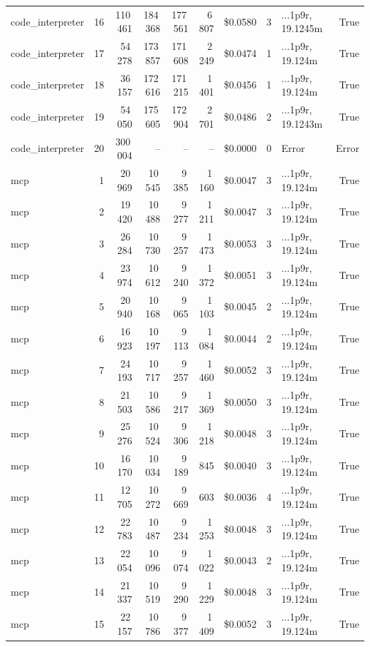 \documentclass[a4paper,11pt]{article}
\begin{document}
\begin{table}[H]
{\begin{tabular}{l r r r r r r r l r}
code\_interpreter & 16 & 110\,461 & 184\,368 & 177\,561 & 6\,807 & \$0.0580 & 3 & ...1p9r, 19.1245m & True \\
code\_interpreter & 17 & 54\,278 & 173\,857 & 171\,608 & 2\,249 & \$0.0474 & 1 & ...1p9r, 19.124m & True \\
code\_interpreter & 18 & 36\,157 & 172\,616 & 171\,215 & 1\,401 & \$0.0456 & 1 & ...1p9r, 19.124m & True \\
code\_interpreter & 19 & 54\,050 & 175\,605 & 172\,904 & 2\,701 & \$0.0486 & 2 & ...1p9r, 19.1243m & True \\
code\_interpreter & 20 & 300\,004 & -- & -- & -- & \$0.0000 & 0 & Error & Error \\
\midrule
mcp & 1 & 20\,969 & 10\,545 & 9\,385 & 1\,160 & \$0.0047 & 3 & ...1p9r, 19.124m & True \\
mcp & 2 & 19\,420 & 10\,488 & 9\,277 & 1\,211 & \$0.0047 & 3 & ...1p9r, 19.124m & True \\
mcp & 3 & 26\,284 & 10\,730 & 9\,257 & 1\,473 & \$0.0053 & 3 & ...1p9r, 19.124m & True \\
mcp & 4 & 23\,974 & 10\,612 & 9\,240 & 1\,372 & \$0.0051 & 3 & ...1p9r, 19.124m & True \\
mcp & 5 & 20\,940 & 10\,168 & 9\,065 & 1\,103 & \$0.0045 & 2 & ...1p9r, 19.124m & True \\
mcp & 6 & 16\,923 & 10\,197 & 9\,113 & 1\,084 & \$0.0044 & 2 & ...1p9r, 19.124m & True \\
mcp & 7 & 24\,193 & 10\,717 & 9\,257 & 1\,460 & \$0.0052 & 3 & ...1p9r, 19.124m & True \\
mcp & 8 & 21\,503 & 10\,586 & 9\,217 & 1\,369 & \$0.0050 & 3 & ...1p9r, 19.124m & True \\
mcp & 9 & 25\,276 & 10\,524 & 9\,306 & 1\,218 & \$0.0048 & 3 & ...1p9r, 19.124m & True \\
mcp & 10 & 16\,170 & 10\,034 & 9\,189 & 845 & \$0.0040 & 3 & ...1p9r, 19.124m & True \\
mcp & 11 & 12\,705 & 10\,272 & 9\,669 & 603 & \$0.0036 & 4 & ...1p9r, 19.124m & True \\
mcp & 12 & 22\,783 & 10\,487 & 9\,234 & 1\,253 & \$0.0048 & 3 & ...1p9r, 19.124m & True \\
mcp & 13 & 22\,054 & 10\,096 & 9\,074 & 1\,022 & \$0.0043 & 2 & ...1p9r, 19.124m & True \\
mcp & 14 & 21\,337 & 10\,519 & 9\,290 & 1\,229 & \$0.0048 & 3 & ...1p9r, 19.124m & True \\
mcp & 15 & 22\,157 & 10\,786 & 9\,377 & 1\,409 & \$0.0052 & 3 & ...1p9r, 19.124m & True \\

\end{tabular}}
\end{table}
\end{document}
